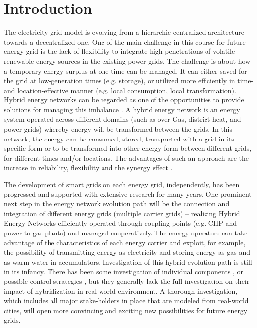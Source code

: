 \documentclass[conference]{IEEEtran}
\begin{document}
\IEEEpeerreviewmaketitle


\section{Introduction}
The electricity grid model is evolving from a hierarchic 
centralized architecture towards a decentralized one. 
One of the main challenge in this course for future energy grid is the  
lack of flexibility to integrate high penetrations of volatile
renewable energy sources in the existing power grids. 
The challenge is about how a temporary energy surplus at one time can
be managed. It can either saved for the grid at low-generation times
(e.g. storage), or utilized more efficiently in time- and
location-effective manner (e.g. local consumption, local
transformation). 
Hybrid energy networks can be regarded as one of the opportunities to  
provide solutions for managing this imbalance \cite{appelrath_2012}.  
A hybrid energy network is an energy system operated across different 
domains (such as over Gas, district heat, and power grids) whereby
energy will be transformed between the grids. In this network, the
energy can be consumed, stored, transported with a grid in its
specific form or to be transformed into other energy form between
different grids, for different times and/or locations.
The advantages of such an approach are the increase in reliability,
flexibility and the synergy effect \cite{arnold_2011}. 

The development of smart grids on each energy grid, independently,
has been progressed and supported with extensive research for many
years. One prominent next step in the energy network evolution path
will be the connection and integration of different energy grids
(multiple carrier grids) – realizing Hybrid Energy Networks
efficiently operated through coupling points (e.g. CHP and
power to gas plants) and managed cooperatively. The energy operators
can take advantage of the characteristics of each energy carrier and
exploit, for example, the possibility of transmitting energy as
electricity and storing energy as gas and as warm water in
accumulators. 
Investigation of this hybrid evolution path is still in
its infancy. There has been some investigation of individual
components \cite{keirstead_2012}, or possible control strategies
\cite{arnold_2009}, but they generally lack the full investigation on
their impact of hybridization in real-world environment. A thorough 
investigation, which includes all major stake-holders in place that
are modeled from real-world cities, will open more convincing and
exciting new possibilities for future energy grids.   
\end{document}
